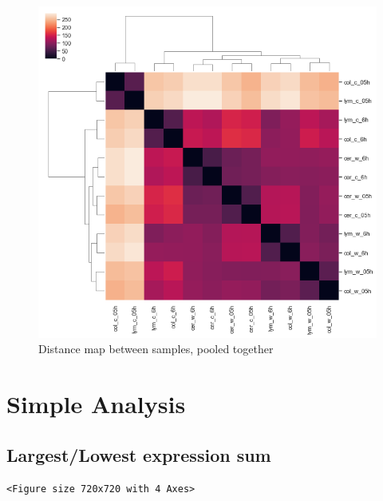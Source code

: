 \documentclass[a4paper]{article}
\begin{document}
\begin{figure}[htbp]
\centering
\includegraphics[width=15cm]{obipy-resources/distancemap_together.png}
\caption{\label{distancemappooled}
Distance map between samples, pooled together}
\end{figure}

\section{Simple Analysis}
\label{sec:org31c615b}

\subsection{Largest/Lowest expression sum}
\label{sec:orgcedbe0a}

\begin{verbatim}
<Figure size 720x720 with 4 Axes>
\end{verbatim}
\end{document}
